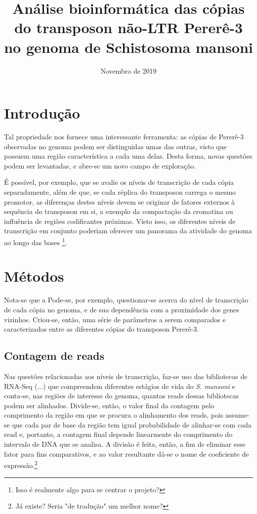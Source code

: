 \documentclass{article}
\title{Análise bioinformática das cópias do transposon não-LTR Pererê-3 no genoma de Schistosoma mansoni}
\date{Novembro de 2019}
\begin{document}
\section{Introdução}

Tal propriedade nos fornece uma interessante ferramenta: as cópias de Pererê-3 observadas no genoma podem ser distinguidas umas das outras, visto que possuem uma região característica a cada uma delas. Desta forma, novas questões podem ser levantadas, e abre-se um novo campo de exploração.

É possível, por exemplo, que se avalie os níveis de transcrição de cada cópia separadamente, além de que, se cada réplica do transposon carrega o mesmo promotor, as diferenças destes níveis devem se originar de fatores externos à sequência do transposon em si, a exemplo da compactação da cromatina ou influência de regiões codificantes próximas. Visto isso, os diferentes níveis de transcrição em conjunto poderiam oferecer um panorama da atividade do genoma ao longo das bases \footnote{Isso é realmente algo para se centrar o projeto?}.
\section{Métodos}
Nota-se que a
Pode-se, por exemplo, questionar-se acerca do nível de transcrição de cada cópia no genoma, e de sua dependência com a proximidade dos genes vizinhos.
Criou-se, então, uma série de parâmetros a serem comparados e caracterizados entre as diferentes cópias do transposon Pererê-3.

\subsection{Contagem de reads}
Nas questões relacionadas aos níveis de transcrição, faz-se uso das bibliotecas de RNA-Seq (...) que compreendem diferentes estágios de vida do \textit{S. mansoni} e conta-se, nas regiões de interesse do genoma, quantos reads dessas bibliotecas podem ser alinhados. Divide-se, então, o valor final da contagem pelo comprimento da região em que se procura o alinhamento dos reads, pois assume-se que cada par de base da região tem igual probabilidade de alinhar-se com cada read e, portanto, a contagem final depende linearmente do comprimento do intervalo de DNA que se analisa. A divisão é feita, então, a fim de eliminar esse fator para fins comparativos, e ao valor resultante dá-se o nome de coeficiente de expressão.\footnote{Já existe? Seria "de tradução" um melhor nome?}
\end{document}
